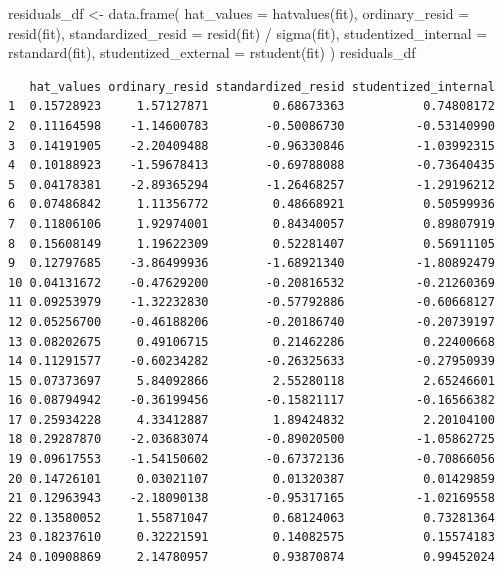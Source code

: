 \documentclass[
  letterpaper,
  DIV=11,
  numbers=noendperiod]{scrreprt}
\newenvironment{Shaded}{\begin{snugshade}}{\end{snugshade}}
\newcommand{\AttributeTok}[1]{\textcolor[rgb]{0.40,0.45,0.13}{#1}}
\newcommand{\FunctionTok}[1]{\textcolor[rgb]{0.28,0.35,0.67}{#1}}
\newcommand{\NormalTok}[1]{\textcolor[rgb]{0.00,0.23,0.31}{#1}}
\newcommand{\OtherTok}[1]{\textcolor[rgb]{0.00,0.23,0.31}{#1}}
\newcommand{\SpecialCharTok}[1]{\textcolor[rgb]{0.37,0.37,0.37}{#1}}
\begin{document}
\begin{Shaded}
\begin{Highlighting}[]
\NormalTok{residuals\_df }\OtherTok{\textless{}{-}} \FunctionTok{data.frame}\NormalTok{(}
  \AttributeTok{hat\_values =} \FunctionTok{hatvalues}\NormalTok{(fit),}
  \AttributeTok{ordinary\_resid =} \FunctionTok{resid}\NormalTok{(fit),}
  \AttributeTok{standardized\_resid =} \FunctionTok{resid}\NormalTok{(fit) }\SpecialCharTok{/} \FunctionTok{sigma}\NormalTok{(fit),}
  \AttributeTok{studentized\_internal =} \FunctionTok{rstandard}\NormalTok{(fit),}
  \AttributeTok{studentized\_external =} \FunctionTok{rstudent}\NormalTok{(fit)}
\NormalTok{)}
\NormalTok{residuals\_df}
\end{Highlighting}
\end{Shaded}

\begin{verbatim}
   hat_values ordinary_resid standardized_resid studentized_internal
1  0.15728923     1.57127871         0.68673363           0.74808172
2  0.11164598    -1.14600783        -0.50086730          -0.53140990
3  0.14191905    -2.20409488        -0.96330846          -1.03992315
4  0.10188923    -1.59678413        -0.69788088          -0.73640435
5  0.04178381    -2.89365294        -1.26468257          -1.29196212
6  0.07486842     1.11356772         0.48668921           0.50599936
7  0.11806106     1.92974001         0.84340057           0.89807919
8  0.15608149     1.19622309         0.52281407           0.56911105
9  0.12797685    -3.86499936        -1.68921340          -1.80892479
10 0.04131672    -0.47629200        -0.20816532          -0.21260369
11 0.09253979    -1.32232830        -0.57792886          -0.60668127
12 0.05256700    -0.46188206        -0.20186740          -0.20739197
13 0.08202675     0.49106715         0.21462286           0.22400668
14 0.11291577    -0.60234282        -0.26325633          -0.27950939
15 0.07373697     5.84092866         2.55280118           2.65246601
16 0.08794942    -0.36199456        -0.15821117          -0.16566382
17 0.25934228     4.33412887         1.89424832           2.20104100
18 0.29287870    -2.03683074        -0.89020500          -1.05862725
19 0.09617553    -1.54150602        -0.67372136          -0.70866056
20 0.14726101     0.03021107         0.01320387           0.01429859
21 0.12963943    -2.18090138        -0.95317165          -1.02169558
22 0.13580052     1.55871047         0.68124063           0.73281364
23 0.18237610     0.32221591         0.14082575           0.15574183
24 0.10908869     2.14780957         0.93870874           0.99452024

\end{verbatim}
\end{document}
